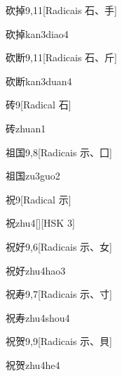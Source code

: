 \begin{entry}{砍掉}{9,11}[Radicais ⽯、⼿]
  \begin{phonetics}{砍掉}{kan3diao4}
  \end{phonetics}
\end{entry}

\begin{entry}{砍断}{9,11}[Radicais ⽯、⽄]
  \begin{phonetics}{砍断}{kan3duan4}
  \end{phonetics}
\end{entry}

\begin{entry}{砖}{9}[Radical ⽯]
  \begin{phonetics}{砖}{zhuan1}
  \end{phonetics}
\end{entry}

\begin{entry}{祖国}{9,8}[Radicais ⽰、⼞]
  \begin{phonetics}{祖国}{zu3guo2}
  \end{phonetics}
\end{entry}

\begin{entry}{祝}{9}[Radical ⽰]
  \begin{phonetics}{祝}{zhu4}[][HSK 3]
  \end{phonetics}
\end{entry}

\begin{entry}{祝好}{9,6}[Radicais ⽰、⼥]
  \begin{phonetics}{祝好}{zhu4hao3}
  \end{phonetics}
\end{entry}

\begin{entry}{祝寿}{9,7}[Radicais ⽰、⼨]
  \begin{phonetics}{祝寿}{zhu4shou4}
  \end{phonetics}
\end{entry}

\begin{entry}{祝贺}{9,9}[Radicais ⽰、⾙]
  \begin{phonetics}{祝贺}{zhu4he4}
  \end{phonetics}
\end{entry}

